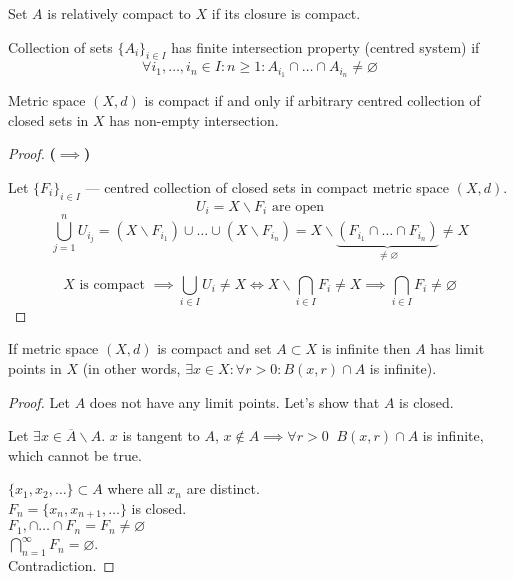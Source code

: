 \begin{definition}
  Set $A$ is relatively compact to $X$ if its closure is compact.
\end{definition}

\begin{definition}
  Collection of sets $\{A_i\} _{i \in  I}$ has finite intersection property (centred system) if \[ 
  \forall i_1, \ldots, i_{n} \in  I : n \ge  1 : A_{i_1} \cap \ldots \cap A_{i_n} \neq  \varnothing\] 
\end{definition}

\begin{theorem}
  Metric space $(X,d)$ is compact if and only if arbitrary centred collection of closed sets in  $X$ has non-empty intersection.
\end{theorem}

\begin{proof}
  \textbf{($\implies$)}

  Let $\{F_i\} _{i \in  I}$ --- centred collection of closed sets in compact metric space $(X,d)$.
  \[ U_i = X \backslash F_i \text{ are open} \] 
  \[ \bigcup_{j=1}^{n} U_{i_j} = (X \backslash F_{i_1}) \cup \ldots \cup (X \backslash F_{i_n}) = X \backslash  \underbrace{\left( F_{i_1} \cap \ldots \cap F_{i_n} \right)}_{\neq  \varnothing} \neq  X \] 

  \[ X \text{ is compact } \implies \bigcup_{i \in I} U_{i} \neq  X \iff X \backslash \bigcap_{i \in I} F_i \neq  X \implies \bigcap_{i \in  I}F_i \neq  \varnothing \] 

\end{proof}

\begin{corollary}
  If metric space $(X,d)$ is compact and set $A \subset X$ is infinite then $A$ has limit points in $X$ (in other words, $\exists x \in  X: \forall  r > 0 : B(x,r) \cap A$ is infinite).
\end{corollary}

\begin{proof}
  Let $A$ does not have any limit points. Let's show that $A$ is closed.

  Let $\exists x \in  \overline{A} \backslash A$. $ x$ is tangent to $A$, $x \not\in A \implies \forall r>0 \;\; B(x,r) \cap A$ is infinite, which cannot be true.

  $\{x_1,x_2,\ldots\} \subset A$ where all $x_n$ are distinct.\\
  $F_n = \{x_{n}, x_{n+1}, \ldots\} $ is closed.\\
  $F_1, \cap \ldots \cap F_{n} = F_{n} \neq \varnothing$\\
  $\bigcap_{n=1}^{\infty} F_n = \varnothing$.\\
  Contradiction.
\end{proof}

